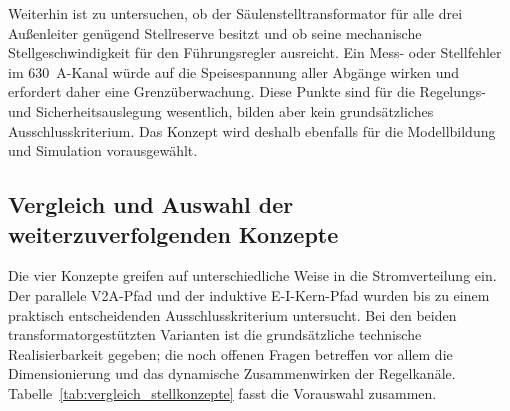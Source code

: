 Weiterhin ist zu untersuchen, ob der Säulenstelltransformator für alle drei
Außenleiter genügend Stellreserve besitzt und ob seine mechanische
Stellgeschwindigkeit für den Führungsregler ausreicht. Ein Mess- oder
Stellfehler im \SI{630}{\ampere}-Kanal würde auf die Speisespannung aller
Abgänge wirken und erfordert daher eine Grenzüberwachung. Diese Punkte sind
für die Regelungs- und Sicherheitsauslegung wesentlich, bilden aber kein
grundsätzliches Ausschlusskriterium. Das Konzept wird deshalb ebenfalls für
die Modellbildung und Simulation vorausgewählt.


\subsection{Vergleich und Auswahl der weiterzuverfolgenden Konzepte}
\label{sec:vergleich_vorauswahl_stellkonzepte}

Die vier Konzepte greifen auf unterschiedliche Weise in die Stromverteilung
ein. Der parallele V2A-Pfad und der induktive E-I-Kern-Pfad wurden bis zu
einem praktisch entscheidenden Ausschlusskriterium untersucht. Bei den beiden
transformatorgestützten Varianten ist die grundsätzliche technische
Realisierbarkeit gegeben; die noch offenen Fragen betreffen vor allem die
Dimensionierung und das dynamische Zusammenwirken der Regelkanäle.
Tabelle~\ref{tab:vergleich_stellkonzepte} fasst die Vorauswahl zusammen.

